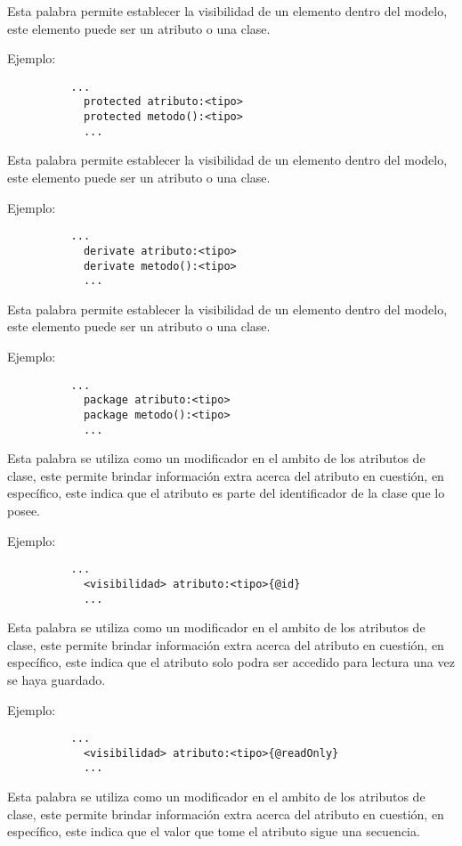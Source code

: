 \begin{description}[align=right,labelwidth=2.5cm]
\item [protected] Esta palabra permite establecer la visibilidad de un elemento
	dentro del modelo, este elemento puede ser un atributo o una clase.

	Ejemplo:
		\begin{lstlisting}
		  ...
			protected atributo:<tipo>
			protected metodo():<tipo>
			...
		\end{lstlisting}

\item[derivate] Esta palabra permite establecer la visibilidad de un elemento
	dentro del modelo, este elemento puede ser un atributo o una clase.

	Ejemplo:
		\begin{lstlisting}
		  ...
			derivate atributo:<tipo>
			derivate metodo():<tipo>
			...
		\end{lstlisting}

\item [package] Esta palabra permite establecer la visibilidad de un elemento
	dentro del modelo, este elemento puede ser un atributo o una clase.

	Ejemplo:
		\begin{lstlisting}
		  ...
			package atributo:<tipo>
			package metodo():<tipo>
			...
		\end{lstlisting}

\item [@id] Esta palabra se utiliza como un modificador en el ambito de
	los atributos de clase, este permite brindar información extra acerca del
	atributo en cuestión, en específico, este indica que el atributo es parte del
	identificador de la clase que lo posee.

	Ejemplo:
		\begin{lstlisting}
		  ...
			<visibilidad> atributo:<tipo>{@id}
			...
		\end{lstlisting}

\item [@readOnly] Esta palabra se utiliza como un modificador en el ambito de
	los atributos de clase, este permite brindar información extra acerca del
	atributo en cuestión, en específico, este indica que el atributo solo podra
	ser accedido para lectura una vez se haya guardado.

	Ejemplo:
		\begin{lstlisting}
		  ...
			<visibilidad> atributo:<tipo>{@readOnly}
			...
		\end{lstlisting}

\item [@sequence] Esta palabra se utiliza como un modificador en el ambito de
	los atributos de clase, este permite brindar información extra acerca del
	atributo en cuestión, en específico, este indica que el valor que tome el
	atributo sigue una secuencia.


\end{description}
